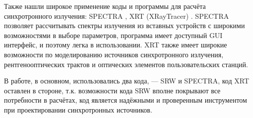 Также нашли широкое применение коды и программы для расчёта синхротронного излучения: SPECTRA \cite{SPECTRA}, XRT (XRayTracer) \cite{XRayTracer}. SPECTRA позволяет рассчитывать спектры излучения из вставных устройств с широкими возможностями в выборе параметров, программа имеет доступный GUI интерфейс, и поэтому легка в использовании. XRT также имеет широкие возможности по моделированию источников синхротронного излучения, рентгенооптических трактов и оптических элементов пользовательских станций.

В работе, в основном, использовались два кода, --- SRW и SPECTRA, код XRT оставлен в стороне, т.к. возможности кода SRW вполне покрывают все потребности в расчётах, код является надёжными и проверенным инструментом при проектировании синхротронных источников. 








